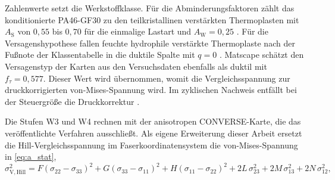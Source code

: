 Zahlenwerte setzt die Werkstoffklasse. Für die Abminderungsfaktoren zählt das konditionierte PA46-GF30 zu den teilkristallinen verstärkten Thermoplasten mit $A_{\mathrm{S}}$ von $0{,}55$ bis $0{,}70$ für die einmalige Lastart und $A_{\mathrm{W}} = 0{,}25$ \cite[S.~346 und 362]{Sto18}. Für die Versagenshypothese fallen feuchte hydrophile verstärkte Thermoplaste nach der Fußnote der Klassentabelle in die duktile Spalte mit $q = 0$ \cite[S.~323]{Sto18}. Matscape schätzt den Versagenstyp der Karten aus den Versuchsdaten ebenfalls als duktil mit $f_{\tau} = 0{,}577$. Dieser Wert wird übernommen, womit die Vergleichsspannung zur druckkorrigierten von-Mises-Spannung wird. Im zyklischen Nachweis entfällt bei der Steuergröße die Druckkorrektur \cite[S.~374]{Sto18}.

Die Stufen W3 und W4 rechnen mit der anisotropen CONVERSE-Karte, die das veröffentlichte Verfahren ausschließt. Als eigene Erweiterung dieser Arbeit ersetzt die Hill-Vergleichsspannung im Faserkoordinatensystem die von-Mises-Spannung in \eqref{eq:a_stat},
\begin{equation}
    \sigma_{\mathrm{V,Hill}}^{2} = F\left(\sigma_{22} - \sigma_{33}\right)^{2} + G\left(\sigma_{33} - \sigma_{11}\right)^{2} + H\left(\sigma_{11} - \sigma_{22}\right)^{2} + 2L\,\sigma_{23}^{2} + 2M\,\sigma_{13}^{2} + 2N\,\sigma_{12}^{2} ,
    \label{eq:hill}
\end{equation}
